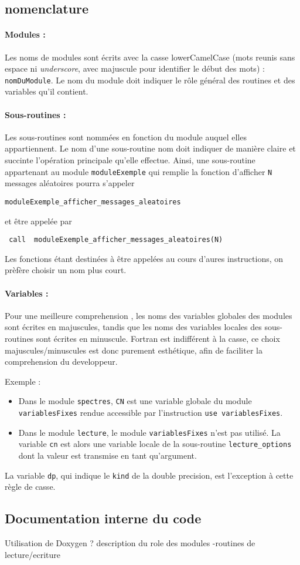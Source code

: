 \subsection{nomenclature}
\paragraph{Modules :}
Les noms de modules sont écrits avec la casse lowerCamelCase (mots reunis sans espace ni {\it underscore}, avec majuscule pour identifier le début des mots) : \lstinline{nomDuModule}.
Le nom du module doit indiquer le r\^ole général des routines et des variables qu'il contient.

\paragraph{Sous-routines :} 
Les sous-routines sont nommées en fonction du module auquel elles appartiennent.
Le nom d'une sous-routine nom doit indiquer de manière claire et succinte l'opération principale qu'elle effectue.
Ainsi, une sous-routine appartenant au module \lstinline{moduleExemple} qui remplie la fonction d'afficher \lstinline{N} messages aléatoires pourra s'appeler 

\lstinline{moduleExemple_afficher_messages_aleatoires}

 et être appelée par
 
 \lstinline{ call  moduleExemple_afficher_messages_aleatoires(N)}

Les fonctions étant destinées à être appelées au cours d'aures instructions, on prèfère choisir un nom plus court.

\paragraph{Variables :}
Pour une meilleure comprehension , les noms des variables globales des modules sont écrites en majuscules, tandis que les noms des variables locales des sous-routines sont écrites en minuscule.
Fortran est indifférent à la casse, ce choix majuscules/minuscules est donc purement esthétique, afin de faciliter la comprehension du developpeur.

Exemple : 
\begin{itemize}
\item Dans le module \lstinline{spectres}, \lstinline{CN} est une variable globale du module \lstinline{variablesFixes} rendue accessible par l'instruction \lstinline{use variablesFixes}.
\item Dans le module \lstinline{lecture}, le module \lstinline{variablesFixes} n'est pas utilisé.
 La variable \lstinline{cn} est alors une variable locale de la sous-routine \lstinline{lecture_options}  dont la valeur est transmise en tant qu'argument. 
\end{itemize}
La variable \lstinline{dp}, qui indique le \lstinline{kind} de la double precision, est l'exception à cette règle de casse.

\subsection{Documentation interne du code}

Utilisation de Doxygen ?
description du role des modules
-routines de lecture/ecriture


\FloatBarrier
